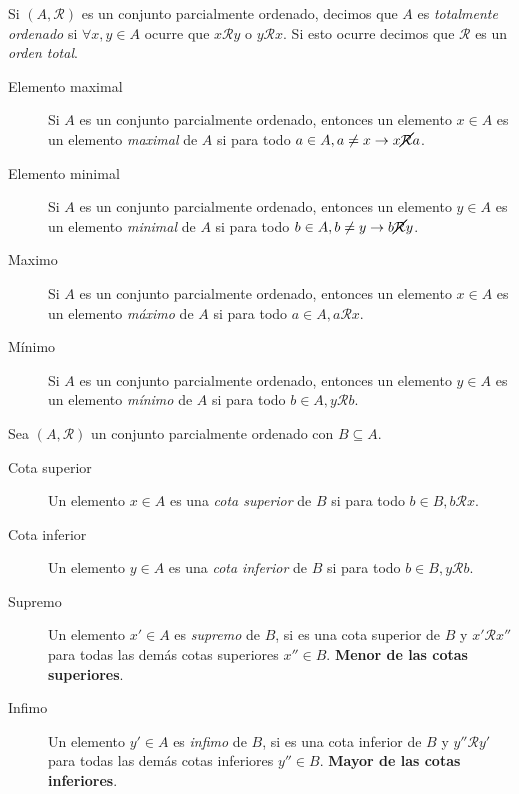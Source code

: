 \documentclass[a4paper, twoside]{article}
\begin{document}
	Si $(A,\mathcal{R})$ es un conjunto parcialmente ordenado, decimos que $A$ es \emph{totalmente ordenado} si $\forall x,y \in A$ ocurre que $x\mathcal{R}y$ o $y\mathcal{R}x$.
	Si esto ocurre decimos que $\mathcal{R}$ es un \emph{orden total}.
	
        \begin{description}
            \item[Elemento maximal] Si $A$ es un conjunto parcialmente ordenado, entonces un elemento  $x \in A$ es 
            un elemento \emph{maximal} de $A$ si para todo $a \in A, a \neq x \rightarrow x \cancel{\mathcal{R}} a$.
            \item[Elemento minimal] Si $A$ es un conjunto parcialmente ordenado, entonces un elemento  $y \in A$ es 
            un elemento \emph{minimal} de $A$ si para todo $b \in A, b \neq y \rightarrow b \cancel{\mathcal{R}} y$.
            \item[Maximo] Si $A$ es un conjunto parcialmente ordenado, entonces un elemento  $x \in A$ es 
            un elemento \emph{máximo} de $A$ si para todo $a \in A,a \mathcal{R} x$.
            \item[Mínimo] Si $A$ es un conjunto parcialmente ordenado, entonces un elemento  $y \in A$ es 
            un elemento \emph{mínimo} de $A$ si para todo $b \in A,y \mathcal{R} b$.
        \end{description}
            Sea $(A,\mathcal{R})$ un conjunto parcialmente ordenado con $B \subseteq A$.

        \begin{description}  
            \item[Cota superior]  Un elemento  $x \in A$ es una \emph{cota superior} de $B$ si para todo $b \in B,b \mathcal{R} x$.
            \item[Cota inferior]  Un elemento  $y \in A$ es una \emph{cota inferior} de $B$ si para todo $b \in B,y \mathcal{R} b$.
            \item[Supremo] Un elemento $x' \in A$ es \emph{supremo} de $B$, si es una cota superior de $B$ y $x'\mathcal{R}x''$ 
            para todas las demás cotas superiores $x'' \in B$. \textbf{Menor de las cotas superiores}.
            \item[Infimo] Un elemento $y' \in A$ es \emph{infimo} de $B$, si es una cota inferior de $B$ y $y''\mathcal{R}y'$ 
            para todas las demás cotas inferiores $y'' \in B$. \textbf{Mayor de las cotas inferiores}.
        \end{description}
        
\end{document}
